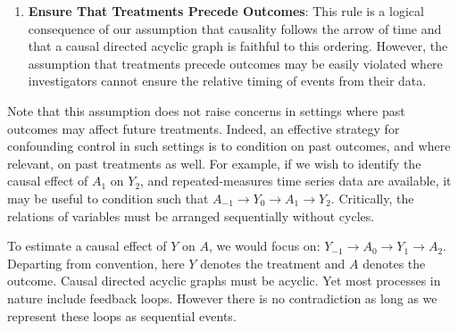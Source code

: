 \documentclass[
  single column]{article}
\providecommand{\tightlist}{%
  \setlength{\itemsep}{0pt}\setlength{\parskip}{0pt}}\usepackage{longtable,booktabs,array}
\begin{document}
\begin{enumerate}
\def\labelenumi{\arabic{enumi}.}
\tightlist
\item
  \textbf{Ensure That Treatments Precede Outcomes}: This rule is a
  logical consequence of our assumption that causality follows the arrow
  of time and that a causal directed acyclic graph is faithful to this
  ordering. However, the assumption that treatments precede outcomes may
  be easily violated where investigators cannot ensure the relative
  timing of events from their data.
\end{enumerate}

Note that this assumption does not raise concerns in settings where past
outcomes may affect future treatments. Indeed, an effective strategy for
confounding control in such settings is to condition on past outcomes,
and where relevant, on past treatments as well. For example, if we wish
to identify the causal effect of \(A_1\) on \(Y_2\), and
repeated-measures time series data are available, it may be useful to
condition such that
\(\boxed{A_{-1}} \to \boxed{Y_0} \to A_1 \rightarrow Y_2\). Critically,
the relations of variables must be arranged sequentially without cycles.

To estimate a causal effect of \(Y\) on \(A\), we would focus on:
\(\boxed{Y_{-1}} \to \boxed{A_0} \to Y_1 \rightarrow A_2\). Departing
from convention, here \(Y\) denotes the treatment and \(A\) denotes the
outcome. Causal directed acyclic graphs must be acyclic. Yet most
processes in nature include feedback loops. However there is no
contradiction as long as we represent these loops as sequential events.
\end{document}
